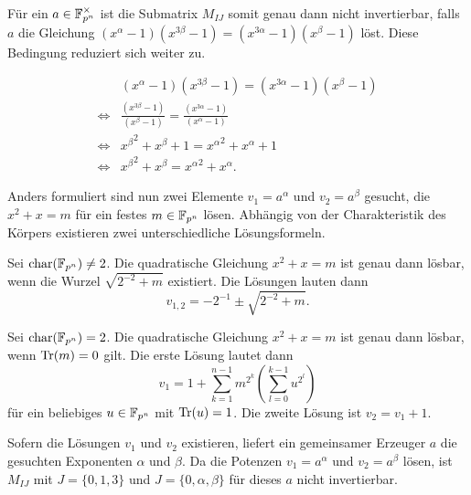 Für ein $a \in \field{p}[n]^\times$ ist die Submatrix $M_{IJ}$ somit genau dann nicht invertierbar, falls $a$ die Gleichung $(x^{\alpha} -1)(x^{3\beta} -1) = (x^{3\alpha} -1)(x^{\beta} -1)$ löst. Diese Bedingung reduziert sich weiter zu.

\begin{align}
        & (x^{\alpha} -1)(x^{3\beta} -1) = (x^{3\alpha} -1)(x^{\beta} -1) \nonumber \\
    \iff & \frac{(x^{3\beta} -1)}{(x^{\beta} -1)} = \frac{(x^{3\alpha} -1)}{(x^{\alpha} -1)} \nonumber \\
    \iff & {x^\beta}^2 + x^{\beta} + 1 = {x^{\alpha}}^2 + x^{\alpha} + 1 \nonumber \\
    \iff & {x^\beta}^2 + x^{\beta} = {x^{\alpha}}^2 + x^{\alpha}. \label{equation:013}
\end{align}

Anders formuliert sind nun zwei Elemente $v_1 = a^\alpha$ und $v_2 = a^\beta$ gesucht, die $x^2 + x = m$ für ein festes $m \in \field{p}[n]$ lösen. Abhängig von der Charakteristik des Körpers existieren zwei unterschiedliche Lösungsformeln.

\begin{lemma}
    Sei $\charac(\field{p}[n]) \neq 2$. Die quadratische Gleichung $x^2 + x = m$ ist genau dann lösbar, wenn die Wurzel $\sqrt{2^{-2} + m}$ existiert. Die Lösungen lauten dann
    \begin{equation*}
        v_{1,2} = -2^{-1} \pm \sqrt{2^{-2} + m}.
    \end{equation*}
\end{lemma}

\begin{lemma}
    Sei $\charac(\field{p}[n]) = 2$. Die quadratische Gleichung $x^2 + x = m$ ist genau dann lösbar, wenn $\mathrm{Tr}(m) = 0$ gilt. Die erste Lösung lautet dann
    \begin{equation*}
        v_1 = 1 + \sum_{k=1}^{n-1} m^{2^k}(\sum_{l=0}^{k-1} u^{2^l})
    \end{equation*}
     für ein beliebiges $u \in \field{p}[n]$ mit $\mathrm{Tr}(u) = 1$. Die zweite Lösung ist $v_2 = v_1 + 1$.
\end{lemma}

Sofern die Lösungen $v_1$ und $v_2$ existieren, liefert ein gemeinsamer Erzeuger $a$ die gesuchten Exponenten $\alpha$ und $\beta$. Da die Potenzen $v_1 = a^\alpha$ und $v_2 = a^\beta$  lösen, ist $M_{IJ}$ mit $J = \{0,1,3\}$ und $J = \{0,\alpha,\beta\}$ für dieses $a$ nicht invertierbar.

